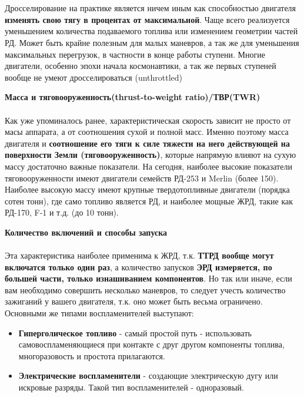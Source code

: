 \documentclass{article}
\begin{document}
\begin{enumerate}
{    \\ \\
    Дросселирование на практике является ничем иным как способностью двигателя \textbf{изменять свою тягу в процентах от максимальной}. Чаще всего реализуется уменьшением количества подаваемого топлива или изменением геометрии частей РД. Может быть крайне полезным для малых маневров, а так же для уменьшения максимальных перегрузок, в частности в конце работы ступени. Многие двигатели, особенно эпохи начала космонавтики, а так же первых ступеней вообще не умеют дросселироваться (unthrottled)
    \\ 
    \item \textbf{Масса и тяговооруженность(thrust-to-weight ratio)/ТВР(TWR)} \\ \\
    Как уже упоминалось ранее, характеристическая скорость зависит не просто от масы аппарата, а от соотношения сухой и полной масс. Именно поэтому масса двигателя и \textbf{соотношение его тяги к силе тяжести на него действующей на поверхности Земли (тяговооруженность)}, которые напрямую влияют на сухую массу достаточно важные показатели. На сегодня, наиболее высокие показатели тяговооруженности имеют двигатели семейств РД-253 и Merlin (более 150). Наиболее высокую массу имеют крупные твердотопливные двигатели (порядка сотен тонн), где само топливо является РД, и наиболее мощные ЖРД, такие как РД-170, F-1 и т.д. (до 10 тонн). 
    \\
    \item \textbf{Количество включений и способы запуска} \\ \\
    Эта характеристика наиболее применима к ЖРД, т.к. \textbf{ТТРД вообще могут включатся только один раз}, а количество запусков \textbf{ЭРД измеряется, по большей части, только изнашиванием компонентов}. Но так или иначе, если вам необходимо совершить несколько маневров, то следует учесть количество зажиганий у вашего двигателя, т.к. оно может быть весьма ограничено. Основными же типами воспламенителей выступают:
    \begin{itemize}
        \item \textbf{Гиперголическое топливо} - самый простой путь - использовать самовоспламеняющиеся при контакте с друг другом компоненты топлива, многоразовость и простота прилагаются.
        \item \textbf{Электрические воспламенители} - создающие электрическую дугу или искровые разряды. Такой тип воспламенителей - одноразовый.

\end{itemize}}
\end{enumerate}
\end{document}
